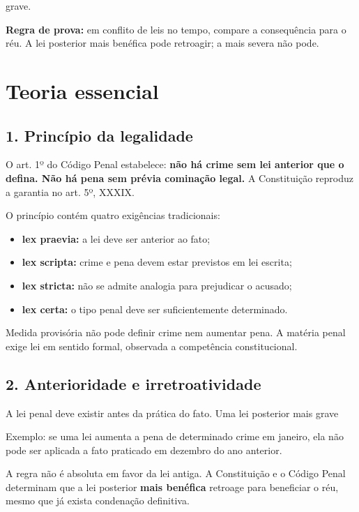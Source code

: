 \documentclass[11pt,a4paper]{article}
\begin{document}
   grave.

\textbf{Regra de prova:} em conflito de leis no tempo, compare a consequência para o réu. A lei posterior mais benéfica pode retroagir; a mais severa não pode.

\section*{Teoria essencial}

\subsection*{1. Princípio da legalidade}

O art. 1º do Código Penal estabelece: \textbf{não há crime sem lei anterior que o defina. Não há pena sem prévia cominação legal.} A Constituição reproduz a garantia no art. 5º, XXXIX.

O princípio contém quatro exigências tradicionais:

\begin{itemize}
  \item \textbf{lex praevia:} a lei deve ser anterior ao fato;
  \item \textbf{lex scripta:} crime e pena devem estar previstos em lei escrita;
  \item \textbf{lex stricta:} não se admite analogia para prejudicar o acusado;
  \item \textbf{lex certa:} o tipo penal deve ser suficientemente determinado.
\end{itemize}

Medida provisória não pode definir crime nem aumentar pena. A matéria penal exige lei em sentido formal, observada a competência constitucional.

\subsection*{2. Anterioridade e irretroatividade}

A lei penal deve existir antes da prática do fato. Uma lei posterior mais grave

Exemplo: se uma lei aumenta a pena de determinado crime em janeiro, ela não pode ser aplicada a fato praticado em dezembro do ano anterior.

A regra não é absoluta em favor da lei antiga. A Constituição e o Código Penal determinam que a lei posterior \textbf{mais benéfica} retroage para beneficiar o réu, mesmo que já exista condenação definitiva.
\end{document}
